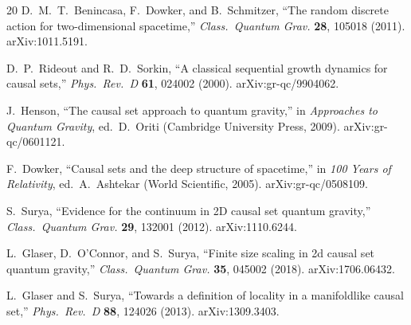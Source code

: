 \documentclass[12pt,a4paper]{article}
\begin{document}
\begin{thebibliography}{20}
D.~M.~T.~Benincasa, F.~Dowker, and B.~Schmitzer,
``The random discrete action for two-dimensional spacetime,''
\textit{Class.\ Quantum Grav.} \textbf{28}, 105018 (2011).
arXiv:1011.5191.

D.~P.~Rideout and R.~D.~Sorkin,
``A classical sequential growth dynamics for causal sets,''
\textit{Phys.\ Rev.\ D} \textbf{61}, 024002 (2000).
arXiv:gr-qc/9904062.

J.~Henson,
``The causal set approach to quantum gravity,''
in \textit{Approaches to Quantum Gravity}, ed.\ D.~Oriti
(Cambridge University Press, 2009). arXiv:gr-qc/0601121.

F.~Dowker,
``Causal sets and the deep structure of spacetime,''
in \textit{100 Years of Relativity}, ed.\ A.~Ashtekar
(World Scientific, 2005). arXiv:gr-qc/0508109.

S.~Surya,
``Evidence for the continuum in 2D causal set quantum gravity,''
\textit{Class.\ Quantum Grav.} \textbf{29}, 132001 (2012).
arXiv:1110.6244.

L.~Glaser, D.~O'Connor, and S.~Surya,
``Finite size scaling in 2d causal set quantum gravity,''
\textit{Class.\ Quantum Grav.} \textbf{35}, 045002 (2018).
arXiv:1706.06432.

L.~Glaser and S.~Surya,
``Towards a definition of locality in a manifoldlike causal set,''
\textit{Phys.\ Rev.\ D} \textbf{88}, 124026 (2013).
arXiv:1309.3403.

\end{thebibliography}
\end{document}
